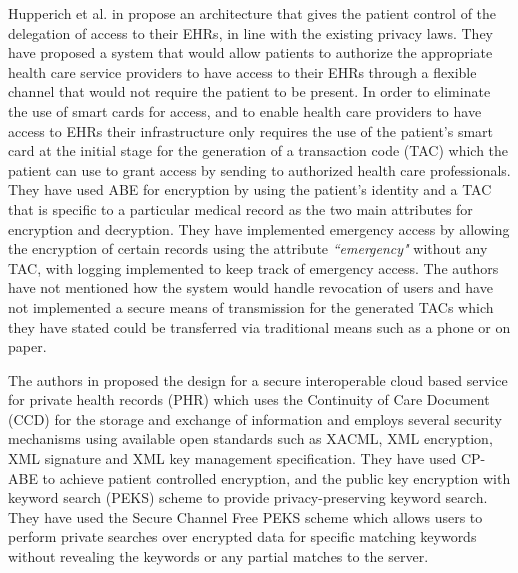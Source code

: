 Hupperich et al. in \cite{Hupperich2012} propose an architecture that gives the patient control of the delegation of access to their EHRs, in line with the existing privacy laws. They have proposed a system that would allow patients to authorize the appropriate health care service providers to have access to their EHRs through a flexible channel that would not require the patient to be present. In order to eliminate the use of smart cards for access, and to enable health care providers to have access to EHRs their infrastructure only requires the use of the patient’s smart card at the initial stage for the generation of a transaction code (TAC) which the patient can use to grant access by sending to authorized health care professionals. They have used ABE for encryption by using the patient’s identity and a TAC that is specific to a particular medical record as the two main attributes for encryption and decryption. They have implemented emergency access by allowing the encryption of certain records using the attribute \textit{``emergency"} without any TAC, with logging implemented to keep track of emergency access. The authors have not mentioned how the system would handle revocation of users and have not implemented a secure means of transmission for the generated TACs which they have stated could be transferred via traditional means such as a phone or on paper.

The authors in \cite{Hsieh2012} proposed the design for a secure interoperable cloud based service for private health records (PHR) which uses the Continuity of Care Document (CCD) for the storage and exchange of information and employs several security mechanisms using available open standards such as XACML, XML encryption, XML signature and XML key management specification. They have used CP-ABE to achieve patient controlled encryption, and the public key encryption with keyword search (PEKS) scheme to provide privacy-preserving keyword search. They have used the Secure Channel Free PEKS scheme which allows users to perform private searches over encrypted data for specific matching keywords without revealing the keywords or any partial matches to the server.

